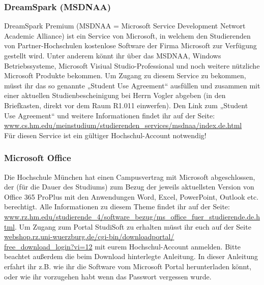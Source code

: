 \subsubsection{DreamSpark (MSDNAA)}
DreamSpark Premium (MSDNAA = Microsoft Service Development 
Networt Academic Alliance) ist ein Service von Microsoft, in welchem 
den Studierenden von Partner-Hochschulen kostenlose Software der 
Firma Microsoft zur Verfügung gestellt wird. \doublebreak
Unter anderem könnt ihr über das MSDNAA, Windows Betriebssysteme, 
Microsoft Visiual Studio-Professional und noch weitere nützliche Microsoft Produkte bekommen. \doublebreak
Um Zugang zu diesem Service zu bekommen, müsst ihr das so genannte 
„Student Use Agreement“ ausfüllen und zusammen mit einer aktuellen 
Studienbescheinigung bei Herrn Vogler abgeben (in den Briefkasten, 
direkt vor dem Raum R1.011 einwerfen). \doublebreak
Den Link zum „Student Use Agreement“ und weitere Informationen 
findet ihr auf der Seite: \url{www.cs.hm.edu/meinstudium/studierenden_services/msdnaa/index.de.html}\\
Für diesen Service ist ein gültiger Hochschul-Account notwendig!

\subsubsection{Microsoft Office}
Die Hochschule München hat einen Campusvertrag mit Microsoft abgeschlossen, der (für die Dauer des Studiums) zum Bezug der jeweils aktuellsten Version von Office 365 ProPlus mit den Anwendungen Word, Excel, PowerPoint, Outlook etc. berechtigt. Alle Informationen zu diesem Theme findet ihr auf der Seite: \url{www.rz.hm.edu/studierende_4/software_bezug/ms_office_fuer_studierende.de.html}.\doublebreak
Um Zugang zum Portal StudiSoft zu erhalten müsst ihr euch auf der Seite \url{webshop.rz.uni-wuerzburg.de/cgi-bin/downloadportal/}\\ \url{free_download_login?vi=12} mit eurem Hochschul-Account anmelden. Bitte beachtet außerdem die beim Download hinterlegte Anleitung. In dieser Anleitung erfahrt ihr z.B. wie ihr die Software vom Microsoft Portal herunterladen könnt, oder wie ihr vorzugehen habt wenn das Passwort vergessen wurde.